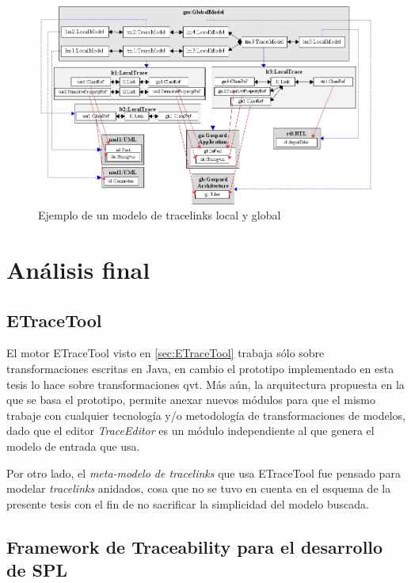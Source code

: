 \documentclass[a4paper,12pt,oneside,spanish]{book}
\begin{document}
\begin{figure}[hbtp]
\centering
\includegraphics[scale=.46]{./img/EjemploLocalGlobalMetamodel}
\caption{Ejemplo de un modelo de tracelinks local y global}
\label{fig:EjemploLocalGlobalMetamodel}
\end{figure}



\section{Análisis final}


\subsection*{ETraceTool}

El motor \textsf{ETraceTool} visto en \ref{sec:ETraceTool} trabaja sólo sobre transformaciones escritas en \textsf{Java}, en cambio el prototipo implementado en esta tesis lo hace sobre transformaciones \gls{qvt}. Más aún, la arquitectura propuesta en la que se basa el prototipo, permite anexar nuevos módulos para que el mismo trabaje con cualquier tecnología y/o metodología de transformaciones de modelos, dado que el editor \textsl{TraceEditor} es un módulo independiente al que genera el modelo de entrada que usa.

Por otro lado, el \textit{meta-modelo de tracelinks} que usa \textsf{ETraceTool} fue pensado para modelar \textit{tracelinks} anidados, cosa que no se tuvo en cuenta en el esquema de la presente tesis con el fin de no sacrificar la simplicidad del modelo buscada.


\subsection*{Framework de Traceability para el desarrollo de SPL}
\end{document}
